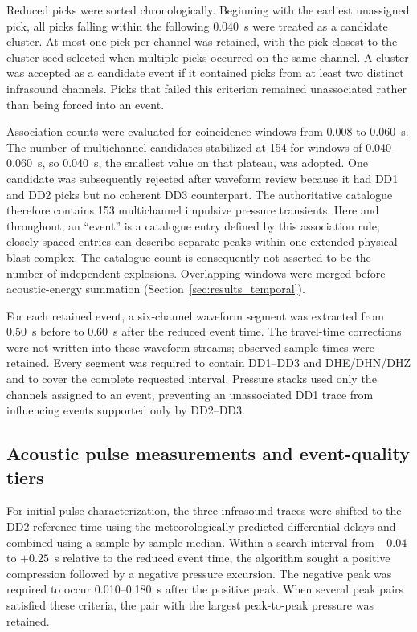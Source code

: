 \documentclass[]{seismica}
\begin{document}
Reduced picks were sorted chronologically. Beginning with the earliest unassigned pick, all picks falling within the following 0.040~s were treated as a candidate cluster. At most one pick per channel was retained, with the pick closest to the cluster seed selected when multiple picks occurred on the same channel. A cluster was accepted as a candidate event if it contained picks from at least two distinct infrasound channels. Picks that failed this criterion remained unassociated rather than being forced into an event.

Association counts were evaluated for coincidence windows from 0.008 to
0.060~s. The number of multichannel candidates stabilized at 154 for windows
of 0.040--0.060~s, so 0.040~s, the smallest value on that plateau, was adopted.
One candidate was subsequently rejected after waveform review because it had
DD1 and DD2 picks but no coherent DD3 counterpart. The authoritative catalogue
therefore contains 153 multichannel impulsive pressure transients. Here and
throughout, an ``event'' is a catalogue entry defined by this association rule;
closely spaced entries can describe separate peaks within one extended physical
blast complex. The catalogue count is consequently not asserted to be the
number of independent explosions. Overlapping windows were merged before
acoustic-energy summation (Section~\ref{sec:results_temporal}).

For each retained event, a six-channel waveform segment was extracted from
0.50~s before to 0.60~s after the reduced event time. The travel-time
corrections were not written into these waveform streams; observed sample
times were retained. Every segment was required to contain DD1--DD3 and
DHE/DHN/DHZ and to cover the complete requested interval. Pressure stacks used
only the channels assigned to an event, preventing an unassociated DD1 trace
from influencing events supported only by DD2--DD3.

\subsection{Acoustic pulse measurements and event-quality tiers}

For initial pulse characterization, the three infrasound traces were shifted to the DD2 reference time using the meteorologically predicted differential delays and combined using a sample-by-sample median. Within a search interval from $-0.04$ to $+0.25$~s relative to the reduced event time, the algorithm sought a positive compression followed by a negative pressure excursion. The negative peak was required to occur 0.010--0.180~s after the positive peak. When several peak pairs satisfied these criteria, the pair with the largest peak-to-peak pressure was retained.
\end{document}
